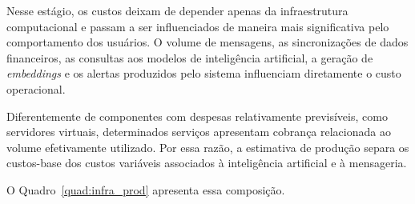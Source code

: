 Nesse estágio, os custos deixam de depender apenas da infraestrutura computacional e passam a ser influenciados de maneira mais significativa pelo comportamento dos usuários. O volume de mensagens, as sincronizações de dados financeiros, as consultas aos modelos de inteligência artificial, a geração de \textit{embeddings} e os alertas produzidos pelo sistema influenciam diretamente o custo operacional.

Diferentemente de componentes com despesas relativamente previsíveis, como servidores virtuais, determinados serviços apresentam cobrança relacionada ao volume efetivamente utilizado. Por essa razão, a estimativa de produção separa os custos-base dos custos variáveis associados à inteligência artificial e à mensageria.

O Quadro~\ref{quad:infra_prod} apresenta essa composição.

